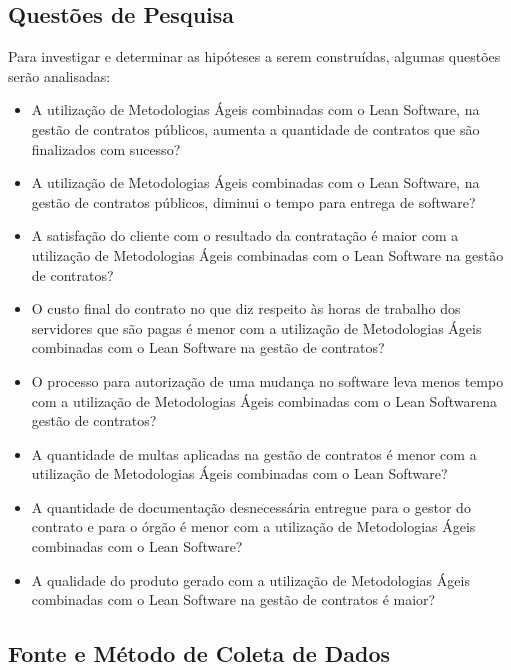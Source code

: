 \subsection[Questões de Pesquisa]{Questões de Pesquisa}

Para investigar e determinar as hipóteses a serem construídas, algumas questões serão analisadas:
\begin{itemize}
\item  A utilização de Metodologias Ágeis combinadas com o Lean Software, na gestão de contratos públicos, aumenta a quantidade de contratos que são finalizados com sucesso?
\item  A utilização de Metodologias Ágeis combinadas com o Lean Software, na gestão de contratos públicos, diminui o tempo para entrega de software?
\item	A satisfação do cliente com o resultado da contratação é maior com a utilização de Metodologias Ágeis combinadas com o Lean Software na gestão de contratos?
\item  O custo final do contrato no que diz respeito às horas de trabalho dos servidores que são pagas é menor com a utilização de Metodologias Ágeis combinadas com o Lean Software na gestão de contratos?
\item  O processo para autorização de uma mudança no software leva menos tempo com a utilização de Metodologias Ágeis combinadas com o Lean Softwarena gestão de contratos?
\item	A quantidade de multas aplicadas na gestão de contratos é menor com a utilização de Metodologias Ágeis combinadas com o Lean Software?
\item	A quantidade de documentação desnecessária entregue para o gestor do contrato e para o órgão é menor com a utilização de Metodologias Ágeis combinadas com o Lean Software?
\item  A qualidade do produto gerado com a utilização de Metodologias Ágeis combinadas com o Lean Software na gestão de contratos é maior?
\end{itemize}

\subsection[Fonte e Método Coleta de Dados]{Fonte e Método de Coleta de Dados}

